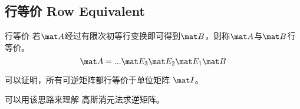 
\subsection{行等价 Row Equivalent}
\begin{definition}{行等价}
若$\mat A$经过有限次初等行变换即可得到$\mat B$，则称$\mat A$与$\mat B$行等价。
\begin{equation}
\mat A= ... \mat E_3 \mat E_2 \mat E_1 \mat  B
\end{equation}
\end{definition}

可以证明，所有可逆矩阵都行等价于单位矩阵 $\mat I$。

可以用该思路来理解 高斯消元法求逆矩阵。
